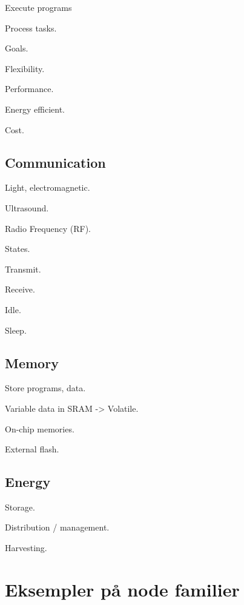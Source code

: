 \begin{description}
\item Execute programs
\item Process tasks.
\end{description}

Goals.

\begin{description}
\item Flexibility.
\item Performance.
\item Energy efficient.
\item Cost.
\end{description}

\subsection{Communication}
\begin{description}
\item Light, electromagnetic.
\item Ultrasound.
\item Radio Frequency (RF).
\end{description}

States.
\begin{description}
\item Transmit.
\item Receive.
\item Idle.
\item Sleep.
\end{description}

\subsection{Memory}

\begin{description}
\item Store programs, data.
\item Variable data in SRAM -> Volatile.
\item On-chip memories.
\item External flash.
\end{description}

\subsection{Energy}
\begin{description}
\item Storage.
\item Distribution / management.
\item Harvesting.
\end{description}
\section{Eksempler på node familier}



